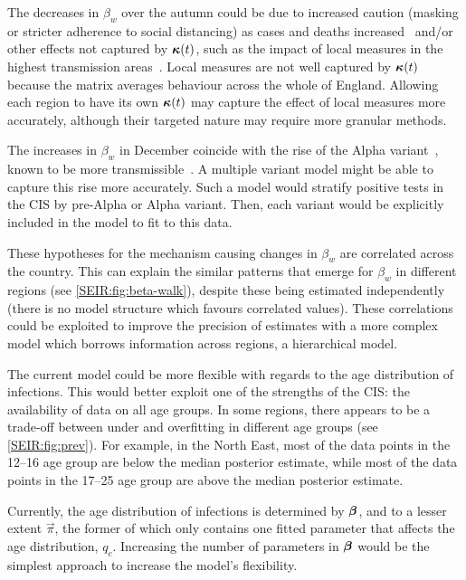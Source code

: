 \documentclass[thesis.tex]{subfiles}
\begin{document}
The decreases in $\beta_w$ over the autumn could be due to increased caution (\eg masking or stricter adherence to social distancing) as cases and deaths increased~\autocite{jarvisEffect} and/or other effects not captured by $\bm{\kappa}(t)$, such as the impact of local measures in the highest transmission areas~\autocite{scottCovid19}.
Local measures are not well captured by $\bm{\kappa}(t)$ because the matrix averages behaviour across the whole of England.
Allowing each region to have its own $\bm{\kappa}(t)$ may capture the effect of local measures more accurately, although their targeted nature may require more granular methods.

The increases in $\beta_w$ in December coincide with the rise of the Alpha variant~\autocite{lythgoeLineage}, known to be more transmissible~\autocite[e.g.][]{daviesEstimated}.
A multiple variant model might be able to capture this rise more accurately.
Such a model would stratify positive tests in the CIS by pre-Alpha or Alpha variant.
Then, each variant would be explicitly included in the model to fit to this data.

These hypotheses for the mechanism causing changes in $\beta_w$ are correlated across the country.
This can explain the similar patterns that emerge for $\beta_w$ in different regions (see \cref{SEIR:fig:beta-walk}), despite these being estimated independently (\ie there is no model structure which favours correlated values).
These correlations could be exploited to improve the precision of estimates with a more complex model which borrows information across regions, \eg a hierarchical model.

The current model could be more flexible with regards to the age distribution of infections.
This would better exploit one of the strengths of the CIS: the availability of data  on all age groups.
In some regions, there appears to be a trade-off between under and overfitting in different age groups (see \cref{SEIR:fig:prev}).
For example, in the North East, most of the data points in the 12--16 age group are below the median posterior estimate, while most of the data points in the 17--25 age group are above the median posterior estimate.

Currently, the age distribution of infections is determined by $\bm{\beta}$, and to a lesser extent $\vec{\pi}$, the former of which only contains one fitted parameter that affects the age distribution, $q_c$.
Increasing the number of parameters in $\bm{\beta}$ would be the simplest approach to increase the model's flexibility.
\end{document}
